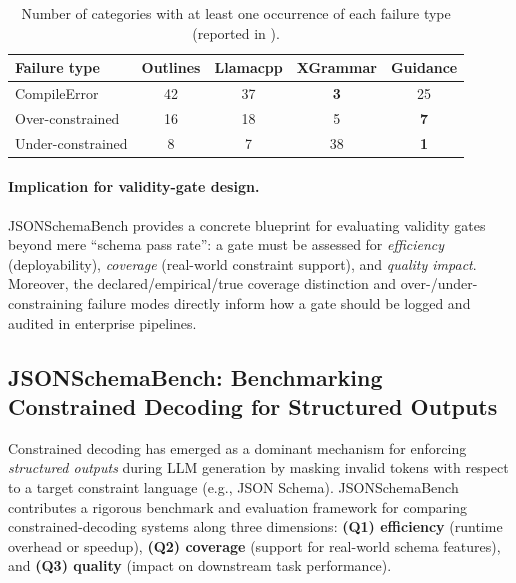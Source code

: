 \begin{table}[t]
\centering
\small
\setlength{\tabcolsep}{6pt}
\renewcommand{\arraystretch}{1.12}
\begin{tabular}{@{}l c c c c@{}}
\toprule
\textbf{Failure type} & \textbf{Outlines} & \textbf{Llamacpp} & \textbf{XGrammar} & \textbf{Guidance} \\
\midrule
CompileError     & 42 & 37 & \textbf{3}  & 25 \\
Over-constrained & 16 & 18 & 5  & \textbf{7} \\
Under-constrained&  8 &  7 & 38 & \textbf{1} \\
\bottomrule
\end{tabular}
\caption{Number of categories with at least one occurrence of each failure type (reported in \cite{geng2025jsonschemabench}).}
\label{tab:jsonschemabench-failures}
\end{table}

\paragraph{Implication for validity-gate design.}
JSONSchemaBench \cite{geng2025jsonschemabench} provides a concrete blueprint for evaluating validity gates beyond mere ``schema pass rate'':
a gate must be assessed for \emph{efficiency} (deployability), \emph{coverage} (real-world constraint support), and \emph{quality impact}.
Moreover, the declared/empirical/true coverage distinction and over-/under-constraining failure modes directly inform how a gate should be logged and audited in enterprise pipelines.

\subsection{JSONSchemaBench: Benchmarking Constrained Decoding for Structured Outputs}
\label{subsec:jsonschemabench}

Constrained decoding has emerged as a dominant mechanism for enforcing \emph{structured outputs} during LLM generation by masking invalid tokens with respect to a target constraint language (e.g., JSON Schema). JSONSchemaBench \cite{geng2025jsonschemabench} contributes a rigorous benchmark and evaluation framework for comparing constrained-decoding systems along three dimensions:
\textbf{(Q1) efficiency} (runtime overhead or speedup), \textbf{(Q2) coverage} (support for real-world schema features), and \textbf{(Q3) quality} (impact on downstream task performance).

